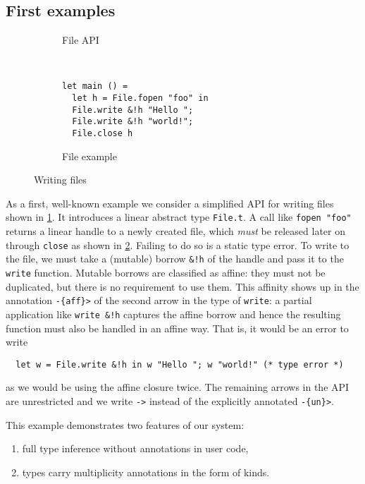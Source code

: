 \subsection{First examples}
\label{sec:first-example}
\begin{figure}[tp]
  \begin{subfigure}[t]{0.45\linewidth}
    
    \caption{File API}
    \label{fig:writing-files-api}
  \end{subfigure}
  ~
  \begin{subfigure}[t]{0.45\linewidth}
\begin{lstlisting}
let main () =
  let h = File.fopen "foo" in
  File.write &!h "Hello ";
  File.write &!h "world!";
  File.close h
\end{lstlisting}
    \caption{File example}
    \label{fig:writing-files-example}
  \end{subfigure}
  \caption{Writing files}
  \label{fig:writing-fiules}
\end{figure}

As a first, well-known example we consider a simplified API for
writing files shown in \cref{fig:writing-files-api}.  It introduces a
linear abstract type \lstinline/File.t/. A call like
\lstinline/fopen "foo"/ returns a linear handle to a newly created
file, which \emph{must} be released later on through \lstinline/close/
as shown in \cref{fig:writing-files-example}. Failing to do so is a
static type error.  To write to the file, we must take a (mutable)
borrow \lstinline/&!h/ of the handle and pass it to the
\lstinline/write/ function. Mutable borrows are classified as affine:
they must not be duplicated, but there is no requirement to use
them. This affinity shows up in the annotation \lstinline/-{aff}>/ of the second arrow in
the type of \lstinline/write/: a partial application like
\lstinline/write &!h/ captures the affine borrow and hence the
resulting function must also be handled in an affine way. That is, it
would be an error to write
\begin{lstlisting}
  let w = File.write &!h in w "Hello "; w "world!" (* type error *)
\end{lstlisting}
as we would be using the affine closure twice. The remaining arrows in
the API are unrestricted and we write \lstinline/->/ instead of the
explicitly annotated \lstinline/-{un}>/.


This example demonstrates two features of our system:
\begin{enumerate}
\item full type inference without annotations in user code,
\item types carry multiplicity annotations in the form of kinds.
\end{enumerate}

